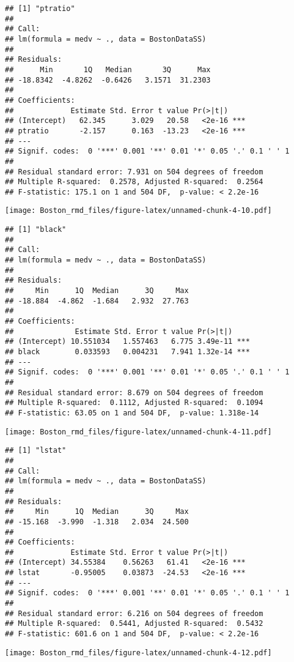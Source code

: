 \documentclass[]{article}
\begin{document}
\begin{verbatim}
## [1] "ptratio"
## 
## Call:
## lm(formula = medv ~ ., data = BostonDataSS)
## 
## Residuals:
##      Min       1Q   Median       3Q      Max 
## -18.8342  -4.8262  -0.6426   3.1571  31.2303 
## 
## Coefficients:
##             Estimate Std. Error t value Pr(>|t|)    
## (Intercept)   62.345      3.029   20.58   <2e-16 ***
## ptratio       -2.157      0.163  -13.23   <2e-16 ***
## ---
## Signif. codes:  0 '***' 0.001 '**' 0.01 '*' 0.05 '.' 0.1 ' ' 1
## 
## Residual standard error: 7.931 on 504 degrees of freedom
## Multiple R-squared:  0.2578, Adjusted R-squared:  0.2564 
## F-statistic: 175.1 on 1 and 504 DF,  p-value: < 2.2e-16
\end{verbatim}

\texttt{[image: Boston\_rmd\_files/figure-latex/unnamed-chunk-4-10.pdf]}

\begin{verbatim}
## [1] "black"
## 
## Call:
## lm(formula = medv ~ ., data = BostonDataSS)
## 
## Residuals:
##     Min      1Q  Median      3Q     Max 
## -18.884  -4.862  -1.684   2.932  27.763 
## 
## Coefficients:
##              Estimate Std. Error t value Pr(>|t|)    
## (Intercept) 10.551034   1.557463   6.775 3.49e-11 ***
## black        0.033593   0.004231   7.941 1.32e-14 ***
## ---
## Signif. codes:  0 '***' 0.001 '**' 0.01 '*' 0.05 '.' 0.1 ' ' 1
## 
## Residual standard error: 8.679 on 504 degrees of freedom
## Multiple R-squared:  0.1112, Adjusted R-squared:  0.1094 
## F-statistic: 63.05 on 1 and 504 DF,  p-value: 1.318e-14
\end{verbatim}

\texttt{[image: Boston\_rmd\_files/figure-latex/unnamed-chunk-4-11.pdf]}

\begin{verbatim}
## [1] "lstat"
## 
## Call:
## lm(formula = medv ~ ., data = BostonDataSS)
## 
## Residuals:
##     Min      1Q  Median      3Q     Max 
## -15.168  -3.990  -1.318   2.034  24.500 
## 
## Coefficients:
##             Estimate Std. Error t value Pr(>|t|)    
## (Intercept) 34.55384    0.56263   61.41   <2e-16 ***
## lstat       -0.95005    0.03873  -24.53   <2e-16 ***
## ---
## Signif. codes:  0 '***' 0.001 '**' 0.01 '*' 0.05 '.' 0.1 ' ' 1
## 
## Residual standard error: 6.216 on 504 degrees of freedom
## Multiple R-squared:  0.5441, Adjusted R-squared:  0.5432 
## F-statistic: 601.6 on 1 and 504 DF,  p-value: < 2.2e-16
\end{verbatim}

\texttt{[image: Boston\_rmd\_files/figure-latex/unnamed-chunk-4-12.pdf]}
\end{document}
